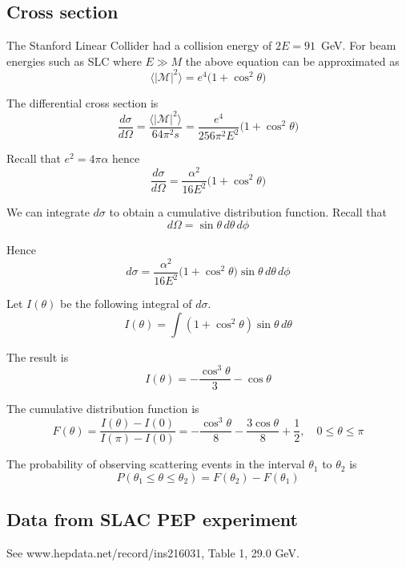 \documentclass[12pt]{article}
\begin{document}
\subsection*{Cross section}
The Stanford Linear Collider
had a collision energy of $2E=91$~GeV.
For beam energies such as SLC where $E\gg M$ the above equation can be approximated as
$$
\langle|\mathcal{M}|^2\rangle=e^4\big(1+\cos^2\theta\big)
$$

The differential cross section is
$$
\frac{d\sigma}{d\Omega}
=\frac{\langle|\mathcal{M}|^2\rangle}{64\pi^2s}
=\frac{e^4}{256\pi^2E^2}\big(1+\cos^2\theta\big)
$$

Recall that $e^2=4\pi\alpha$ hence
\begin{equation*}
\frac{d\sigma}{d\Omega}=\frac{\alpha^2}{16E^2}\big(1+\cos^2\theta\big)
\end{equation*}

We can integrate $d\sigma$ to obtain a cumulative distribution function.
Recall that
\begin{equation*}
d\Omega=\sin\theta\,d\theta\,d\phi
\end{equation*}

Hence
\begin{equation*}
d\sigma=\frac{\alpha^2}{16E^2}\big(1+\cos^2\theta\big)\sin\theta\,d\theta\,d\phi
\end{equation*}

Let $I(\theta)$ be the following integral of $d\sigma$.
\begin{equation*}
I(\theta)=\int\left(1+\cos^2\theta\right)\sin\theta\,d\theta
\end{equation*}

The result is
\begin{equation*}
I(\theta)=-\frac{\cos^3\theta}{3}-\cos\theta
\end{equation*}

The cumulative distribution function is
\begin{equation*}
F(\theta)=\frac{I(\theta)-I(0)}{I(\pi)-I(0)}
=-\frac{\cos^3\theta}{8}-\frac{3\cos\theta}{8}+\frac{1}{2},
\quad
0\le\theta\le\pi
\end{equation*}

The probability of observing scattering events in the interval $\theta_1$ to $\theta_2$ is
\begin{equation*}
P(\theta_1\le\theta\le\theta_2)=F(\theta_2)-F(\theta_1)
\end{equation*}

\subsection*{Data from SLAC PEP experiment}
See www.hepdata.net/record/ins216031, Table 1, 29.0 GeV.
\end{document}
